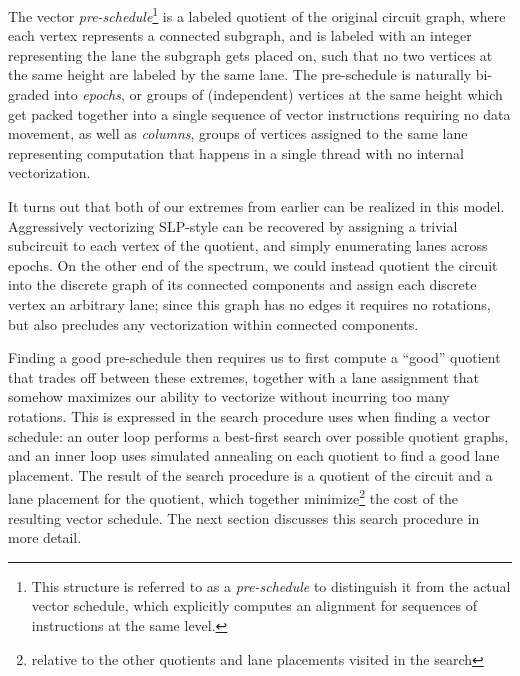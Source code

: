 The vector {\em pre-schedule}\footnote{This structure is referred to as a {\em pre-schedule} to distinguish it from the actual vector schedule, which explicitly computes an alignment for sequences of instructions at the same level. %
} is a labeled quotient of the original circuit graph, where each vertex represents a connected subgraph, and is labeled with an integer representing the lane the subgraph gets placed on, such that no two vertices at the same height are labeled by the same lane.
The pre-schedule is naturally bi-graded into {\em epochs}, or groups of (independent) vertices at the same height which get packed together into a single sequence of vector instructions requiring no data movement, as well as {\em columns}, groups of vertices assigned to the same lane representing computation that happens in a single thread with no internal vectorization.

It turns out that both of our extremes from earlier can be realized in this model.
Aggressively vectorizing SLP-style can be recovered by assigning a trivial subcircuit to each vertex of the quotient, and simply enumerating lanes across epochs.
On the other end of the spectrum, we could instead quotient the circuit into the discrete graph of its connected components and assign each discrete vertex an arbitrary lane; since this graph has no edges it requires no rotations, but also precludes any vectorization within connected components.

Finding a good pre-schedule then requires us to first compute a ``good'' quotient that trades off between these extremes, together with a lane assignment that somehow maximizes our ability to vectorize without incurring too many rotations.
This is expressed in the search procedure {\system} uses when finding a vector schedule: an outer loop performs a best-first search over possible quotient graphs, and an inner loop uses simulated annealing on each quotient to find a good lane placement.
The result of the search procedure is a quotient of the circuit and a lane placement for the quotient, which together minimize\footnote{relative to the other quotients and lane placements visited in the search} the cost of the resulting vector schedule. %
The next section discusses this search procedure in more detail.

